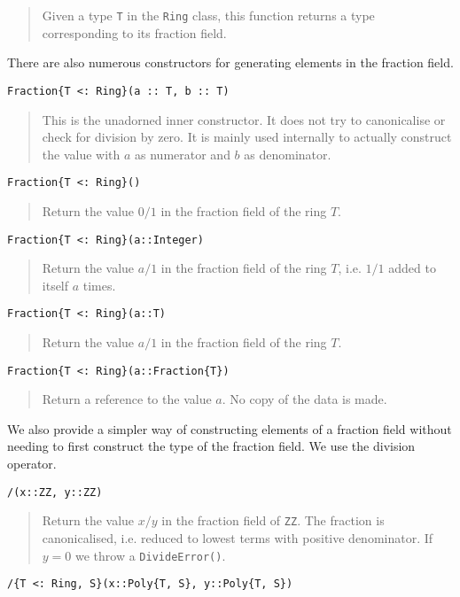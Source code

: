 \documentclass[a4paper,10pt]{article}
\newcommand{\code}{\lstinline}
\newcommand{\desc}[1]{\vspace{-3mm}\begin{quote}#1\end{quote}}
\begin{document}
{{{\desc{Given a type \code{T} in the \code{Ring} class, this function returns a
type corresponding to its fraction field.}

There are also numerous constructors for generating elements in the fraction
field.

\begin{lstlisting}
Fraction{T <: Ring}(a :: T, b :: T)
\end{lstlisting}

\desc{This is the unadorned inner constructor. It does not try to canonicalise
or check for division by zero. It is mainly used internally to actually 
construct the value with $a$ as numerator and $b$ as denominator.}

\begin{lstlisting}
Fraction{T <: Ring}()
\end{lstlisting}

\desc{Return the value $0/1$ in the fraction field of the ring $T$.}

\begin{lstlisting}
Fraction{T <: Ring}(a::Integer)
\end{lstlisting}

\desc{Return the value $a/1$ in the fraction field of the ring $T$, i.e.
$1/1$ added to itself $a$ times.}

\begin{lstlisting}
Fraction{T <: Ring}(a::T)
\end{lstlisting}

\desc{Return the value $a/1$ in the fraction field of the ring $T$.}

\begin{lstlisting}
Fraction{T <: Ring}(a::Fraction{T})
\end{lstlisting}

\desc{Return a reference to the value $a$. No copy of the data is made.}

We also provide a simpler way of constructing elements of a fraction field
without needing to first construct the type of the fraction field. We use
the division operator.

\begin{lstlisting}
/(x::ZZ, y::ZZ)
\end{lstlisting}

\desc{Return the value $x/y$ in the fraction field of \code{ZZ}. The fraction
is canonicalised, i.e. reduced to lowest terms with positive denominator. If
$y = 0$ we throw a \code{DivideError()}.}

\begin{lstlisting}
/{T <: Ring, S}(x::Poly{T, S}, y::Poly{T, S})
\end{lstlisting}

}}}
\end{document}
